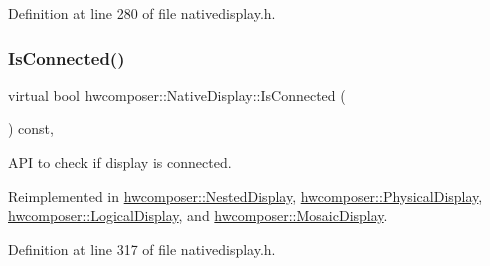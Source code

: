 Definition at line 280 of file nativedisplay.\+h.


\begin{DoxyCode}{0}
\end{DoxyCode}
\mbox{\label{classhwcomposer_1_1NativeDisplay_af22694b3396866fd4f003755f4951b18}} 
\subsubsection{\texorpdfstring{Is\+Connected()}{IsConnected()}}
{\footnotesize\ttfamily virtual bool hwcomposer\+::\+Native\+Display\+::\+Is\+Connected (\begin{DoxyParamCaption}{ }\end{DoxyParamCaption}) const\hspace{0.3cm}{\ttfamily [inline]}, {\ttfamily [virtual]}}

A\+PI to check if display is connected. 

Reimplemented in \mbox{\hyperlink{classhwcomposer_1_1NestedDisplay_a3d55a6460b227f9f9e967d0f414d0159}{hwcomposer\+::\+Nested\+Display}}, \mbox{\hyperlink{classhwcomposer_1_1PhysicalDisplay_af6acaa76c25101eb47883a499311422f}{hwcomposer\+::\+Physical\+Display}}, \mbox{\hyperlink{classhwcomposer_1_1LogicalDisplay_ad1eb84dcbc22cbadbe3d0dc85f18bde3}{hwcomposer\+::\+Logical\+Display}}, and \mbox{\hyperlink{classhwcomposer_1_1MosaicDisplay_a837d28f710438d462fd88b85721528b0}{hwcomposer\+::\+Mosaic\+Display}}.



Definition at line 317 of file nativedisplay.\+h.


\begin{DoxyCode}{0}
\end{DoxyCode}
\mbox{\label{classhwcomposer_1_1NativeDisplay_a548549436616b3b66b88fab4b4975f00}} 
